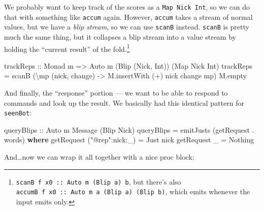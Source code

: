 \documentclass[]{article}
\newenvironment{Shaded}{}{}
\newcommand{\DataTypeTok}[1]{\textcolor[rgb]{0.56,0.13,0.00}{#1}}
\newcommand{\FunctionTok}[1]{\textcolor[rgb]{0.02,0.16,0.49}{#1}}
\newcommand{\KeywordTok}[1]{\textcolor[rgb]{0.00,0.44,0.13}{\textbf{#1}}}
\newcommand{\NormalTok}[1]{#1}
\newcommand{\OperatorTok}[1]{\textcolor[rgb]{0.40,0.40,0.40}{#1}}
\newcommand{\OtherTok}[1]{\textcolor[rgb]{0.00,0.44,0.13}{#1}}
\newcommand{\StringTok}[1]{\textcolor[rgb]{0.25,0.44,0.63}{#1}}
\begin{document}
We probably want to keep track of the scores as a \texttt{Map\ Nick\ Int}, so we
can do that with something like \texttt{accum} again. However, \texttt{accum}
takes a stream of normal values, but we have a \emph{blip stream}, so we can use
\texttt{scanB} instead. \texttt{scanB} is pretty much the same thing, but it
collapses a blip stream into a value stream by holding the ``current result'' of
the fold.\footnote{\texttt{scanB\ f\ x0\ ::\ Auto\ m\ (Blip\ a)\ b}, but there's
  also \texttt{accumB\ f\ x0\ ::\ Auto\ m\ a\ (Blip\ a)\ (Blip\ b)}, which emits
  whenever the input emits only.}

\begin{Shaded}
\begin{Highlighting}[]
\OtherTok{trackReps ::} \DataTypeTok{Monad}\NormalTok{ m }\OtherTok{=\textgreater{}} \DataTypeTok{Auto}\NormalTok{ m (}\DataTypeTok{Blip}\NormalTok{ (}\DataTypeTok{Nick}\NormalTok{, }\DataTypeTok{Int}\NormalTok{)) (}\DataTypeTok{Map} \DataTypeTok{Nick} \DataTypeTok{Int}\NormalTok{)}
\NormalTok{trackReps }\OtherTok{=}\NormalTok{ scanB (\textbackslash{}mp (nick, change) }\OtherTok{{-}\textgreater{}}\NormalTok{ M.insertWith (}\OperatorTok{+}\NormalTok{) nick change mp) M.empty}
\end{Highlighting}
\end{Shaded}

And finally, the ``response'' portion --- we want to be able to respond to
commands and look up the result. We basically had this identical pattern for
\texttt{seenBot}:

\begin{Shaded}
\begin{Highlighting}[]
\OtherTok{queryBlips ::} \DataTypeTok{Auto}\NormalTok{ m }\DataTypeTok{Message}\NormalTok{ (}\DataTypeTok{Blip} \DataTypeTok{Nick}\NormalTok{)}
\NormalTok{queryBlips }\OtherTok{=}\NormalTok{ emitJusts (getRequest }\OperatorTok{.} \FunctionTok{words}\NormalTok{)}
  \KeywordTok{where}
\NormalTok{    getRequest (}\StringTok{"@rep"}\OperatorTok{:}\NormalTok{nick}\OperatorTok{:}\NormalTok{\_) }\OtherTok{=} \DataTypeTok{Just}\NormalTok{ nick}
\NormalTok{    getRequest \_                }\OtherTok{=} \DataTypeTok{Nothing}
\end{Highlighting}
\end{Shaded}

And\ldots now we can wrap it all together with a nice proc block:
\end{document}

